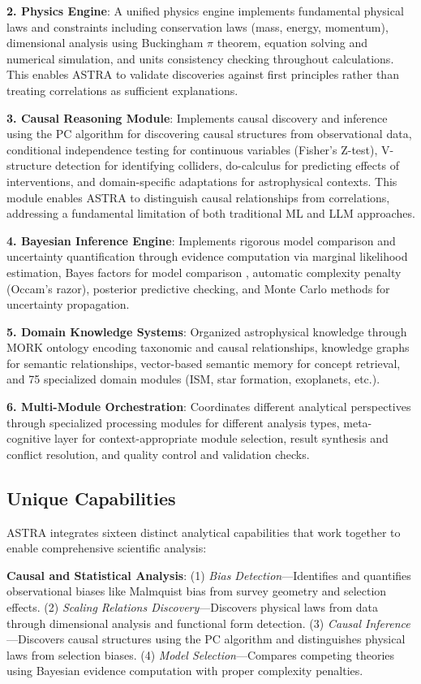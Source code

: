\documentclass[usenatbib]{rasti}
\begin{document}
\textbf{2. Physics Engine}: A unified physics engine implements fundamental physical laws and constraints including conservation laws (mass, energy, momentum), dimensional analysis using Buckingham $\pi$ theorem, equation solving and numerical simulation, and units consistency checking throughout calculations. This enables ASTRA to validate discoveries against first principles rather than treating correlations as sufficient explanations.

\textbf{3. Causal Reasoning Module}: Implements causal discovery and inference using the PC algorithm \cite{spirtes2000} for discovering causal structures from observational data, conditional independence testing for continuous variables (Fisher's Z-test), V-structure detection for identifying colliders, do-calculus for predicting effects of interventions, and domain-specific adaptations for astrophysical contexts. This module enables ASTRA to distinguish causal relationships from correlations, addressing a fundamental limitation of both traditional ML and LLM approaches.

\textbf{4. Bayesian Inference Engine}: Implements rigorous model comparison and uncertainty quantification through evidence computation via marginal likelihood estimation, Bayes factors for model comparison \cite{kass1995}, automatic complexity penalty (Occam's razor), posterior predictive checking, and Monte Carlo methods for uncertainty propagation.

\textbf{5. Domain Knowledge Systems}: Organized astrophysical knowledge through MORK ontology encoding taxonomic and causal relationships, knowledge graphs for semantic relationships, vector-based semantic memory for concept retrieval, and 75 specialized domain modules (ISM, star formation, exoplanets, etc.).

\textbf{6. Multi-Module Orchestration}: Coordinates different analytical perspectives through specialized processing modules for different analysis types, meta-cognitive layer for context-appropriate module selection, result synthesis and conflict resolution, and quality control and validation checks.

\subsection{Unique Capabilities}

ASTRA integrates sixteen distinct analytical capabilities that work together to enable comprehensive scientific analysis:

\textbf{Causal and Statistical Analysis}: (1) \textit{Bias Detection}---Identifies and quantifies observational biases like Malmquist bias from survey geometry and selection effects. (2) \textit{Scaling Relations Discovery}---Discovers physical laws from data through dimensional analysis and functional form detection. (3) \textit{Causal Inference}---Discovers causal structures using the PC algorithm and distinguishes physical laws from selection biases. (4) \textit{Model Selection}---Compares competing theories using Bayesian evidence computation with proper complexity penalties.
\end{document}
